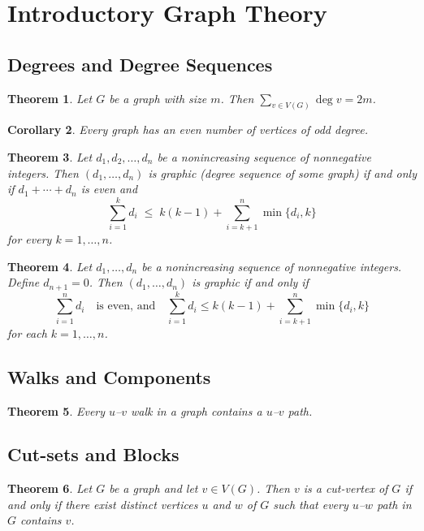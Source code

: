 \documentclass{article}
\newtheorem{theorem}{Theorem}[section]
\newtheorem{corollary}[theorem]{Corollary}
\begin{document}
\section{Introductory Graph Theory}

\subsection{Degrees and Degree Sequences}
\begin{theorem}
Let $G$ be a graph with size $m$. Then $\sum_{v\in V(G)}\deg v = 2m$.
\end{theorem}

\begin{corollary}
Every graph has an even number of vertices of odd degree.
\end{corollary}

\begin{theorem}
Let $d_1, d_2, \ldots, d_n$ be a nonincreasing sequence of nonnegative integers. Then $(d_1,\dots,d_n)$ is graphic (degree sequence of some graph) if and only if $d_1 + \cdots + d_n$ is even and 
$$
\sum_{i=1}^k d_i \;\le\; k(k-1) + \sum_{i=k+1}^n \min\{d_i,k\}
$$
for every $k=1,\dots,n$.
\end{theorem}

\begin{theorem}
Let $d_1,\dots,d_n$ be a nonincreasing sequence of nonnegative integers. Define $d_{n+1}=0$. Then $(d_1,\ldots,d_n)$ is graphic if and only if 
$$
\sum_{i=1}^n d_i \quad\text{is even, and}\quad \sum_{i=1}^k d_i \le k(k-1) + \sum_{i=k+1}^n \min\{d_i,k\}
$$
for each $k=1,\dots,n$.
\end{theorem}

\subsection{Walks and Components}
\begin{theorem}
Every $u$--$v$ walk in a graph contains a $u$--$v$ path.
\end{theorem}

\subsection{Cut-sets and Blocks}
\begin{theorem}
Let $G$ be a graph and let $v\in V(G)$. Then $v$ is a cut-vertex of $G$ if and only if there exist distinct vertices $u$ and $w$ of $G$ such that every $u$--$w$ path in $G$ contains $v$.
\end{theorem}
\end{document}
